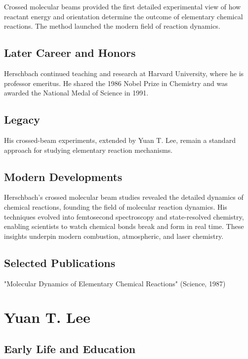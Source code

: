 Crossed molecular beams provided the first detailed experimental view of how reactant energy and orientation determine the outcome of elementary chemical reactions. The method launched the modern field of reaction dynamics.

\subsection*{Later Career and Honors}

Herschbach continued teaching and research at Harvard University, where he is professor emeritus. He shared the 1986 Nobel Prize in Chemistry and was awarded the National Medal of Science in 1991.

\subsection*{Legacy}

His crossed-beam experiments, extended by Yuan T. Lee, remain a standard approach for studying elementary reaction mechanisms.

\subsection*{Modern Developments}

Herschbach's crossed molecular beam studies revealed the detailed dynamics of chemical reactions, founding the field of molecular reaction dynamics. His techniques evolved into femtosecond spectroscopy and state-resolved chemistry, enabling scientists to watch chemical bonds break and form in real time. These insights underpin modern combustion, atmospheric, and laser chemistry.

\subsection*{Selected Publications}

"Molecular Dynamics of Elementary Chemical Reactions" (Science, 1987)

\clearpage

\section{Yuan T. Lee}

\subsection*{Early Life and Education}

